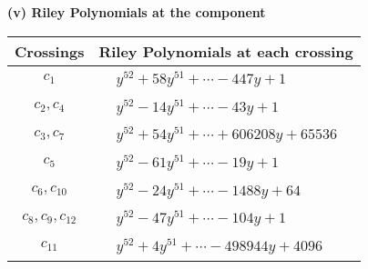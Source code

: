 \documentclass[1p]{elsarticle_modified}
\theoremstyle{definition}
\begin{document}
\flushleft \textbf{(v) Riley Polynomials at the component}\newline \\
\begin{tabular}{m{50pt}|m{274pt}}
Crossings & \hspace{64pt}Riley Polynomials at each crossing \\
\hline $$\begin{aligned}c_{1}\end{aligned}$$&$\begin{aligned}
&y^{52}+58 y^{51}+\cdots-447 y+1
\end{aligned}$\\
\hline $$\begin{aligned}c_{2},c_{4}\end{aligned}$$&$\begin{aligned}
&y^{52}-14 y^{51}+\cdots-43 y+1
\end{aligned}$\\
\hline $$\begin{aligned}c_{3},c_{7}\end{aligned}$$&$\begin{aligned}
&y^{52}+54 y^{51}+\cdots+606208 y+65536
\end{aligned}$\\
\hline $$\begin{aligned}c_{5}\end{aligned}$$&$\begin{aligned}
&y^{52}-61 y^{51}+\cdots-19 y+1
\end{aligned}$\\
\hline $$\begin{aligned}c_{6},c_{10}\end{aligned}$$&$\begin{aligned}
&y^{52}-24 y^{51}+\cdots-1488 y+64
\end{aligned}$\\
\hline $$\begin{aligned}c_{8},c_{9},c_{12}\end{aligned}$$&$\begin{aligned}
&y^{52}-47 y^{51}+\cdots-104 y+1
\end{aligned}$\\
\hline $$\begin{aligned}c_{11}\end{aligned}$$&$\begin{aligned}
&y^{52}+4 y^{51}+\cdots-498944 y+4096
\end{aligned}$\\
\hline
\end{tabular}\\~\\
\end{document}
